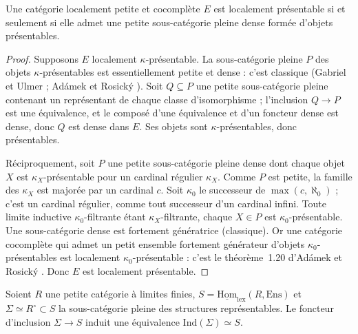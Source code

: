 \begin{enonce}
Une catégorie localement petite et cocomplète $E$ est localement présentable si et seulement si elle admet une petite sous-catégorie pleine dense formée d'objets présentables.
\end{enonce}

\begin{proof}
Supposons $E$ localement $\kappa$-présentable. La sous-catégorie pleine $P$ des objets $\kappa$-présentables est essentiellement petite et dense : c'est classique (Gabriel et Ulmer \cite{gabrielulmer1971} ; Adámek et Rosický \cite{adamekrosicky1994}). Soit $Q \subseteq P$ une petite sous-catégorie pleine contenant un représentant de chaque classe d'isomorphisme ; l'inclusion $Q \to P$ est une équivalence, et le composé d'une équivalence et d'un foncteur dense est dense, donc $Q$ est dense dans $E$. Ses objets sont $\kappa$-présentables, donc présentables.

Réciproquement, soit $P$ une petite sous-catégorie pleine dense dont chaque objet $X$ est $\kappa_X$-présentable pour un cardinal régulier $\kappa_X$. Comme $P$ est petite, la famille des $\kappa_X$ est majorée par un cardinal $c$. Soit $\kappa_0$ le successeur de $\max(c, \aleph_0)$ ; c'est un cardinal régulier, comme tout successeur d'un cardinal infini. Toute limite inductive $\kappa_0$-filtrante étant $\kappa_X$-filtrante, chaque $X \in P$ est $\kappa_0$-présentable. Une sous-catégorie dense est fortement génératrice (classique). Or une catégorie cocomplète qui admet un petit ensemble fortement générateur d'objets $\kappa_0$-présentables est localement $\kappa_0$-présentable : c'est le théorème~1.20 d'Adámek et Rosický \cite{adamekrosicky1994}. Donc $E$ est localement présentable.
\end{proof}

\begin{enonce}
Soient $R$ une petite catégorie à limites finies, $S = \underline{\mathrm{Hom}}_{\mathrm{lex}}(R, \mathrm{Ens})$ et $\Sigma \simeq R^\circ \subset S$ la sous-catégorie pleine des structures représentables. Le foncteur d'inclusion $\Sigma \to S$ induit une équivalence $\mathrm{Ind}(\Sigma) \simeq S$.
\end{enonce}

